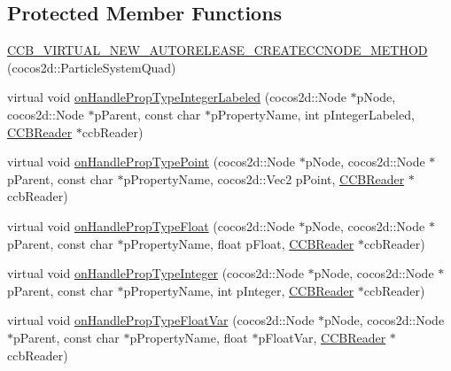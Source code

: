 \subsection*{Protected Member Functions}
\begin{DoxyCompactItemize}
\item 
\hyperlink{classcocosbuilder_1_1ParticleSystemQuadLoader_a6b73cbf9bdc20a14180835461c7916d7}{C\+C\+B\+\_\+\+V\+I\+R\+T\+U\+A\+L\+\_\+\+N\+E\+W\+\_\+\+A\+U\+T\+O\+R\+E\+L\+E\+A\+S\+E\+\_\+\+C\+R\+E\+A\+T\+E\+C\+C\+N\+O\+D\+E\+\_\+\+M\+E\+T\+H\+OD} (cocos2d\+::\+Particle\+System\+Quad)
\item 
virtual void \hyperlink{classcocosbuilder_1_1ParticleSystemQuadLoader_afeb4bcb4009c9fa6815c0f047109e978}{on\+Handle\+Prop\+Type\+Integer\+Labeled} (cocos2d\+::\+Node $\ast$p\+Node, cocos2d\+::\+Node $\ast$p\+Parent, const char $\ast$p\+Property\+Name, int p\+Integer\+Labeled, \hyperlink{classcocosbuilder_1_1CCBReader}{C\+C\+B\+Reader} $\ast$ccb\+Reader)
\item 
virtual void \hyperlink{classcocosbuilder_1_1ParticleSystemQuadLoader_a4889d27aac2073ebee6c9648fbf59c1f}{on\+Handle\+Prop\+Type\+Point} (cocos2d\+::\+Node $\ast$p\+Node, cocos2d\+::\+Node $\ast$p\+Parent, const char $\ast$p\+Property\+Name, cocos2d\+::\+Vec2 p\+Point, \hyperlink{classcocosbuilder_1_1CCBReader}{C\+C\+B\+Reader} $\ast$ccb\+Reader)
\item 
virtual void \hyperlink{classcocosbuilder_1_1ParticleSystemQuadLoader_ababa9b833a13d4ea475f71978e491fe2}{on\+Handle\+Prop\+Type\+Float} (cocos2d\+::\+Node $\ast$p\+Node, cocos2d\+::\+Node $\ast$p\+Parent, const char $\ast$p\+Property\+Name, float p\+Float, \hyperlink{classcocosbuilder_1_1CCBReader}{C\+C\+B\+Reader} $\ast$ccb\+Reader)
\item 
virtual void \hyperlink{classcocosbuilder_1_1ParticleSystemQuadLoader_a28d6a46cce1f26024d6915d81608ae8d}{on\+Handle\+Prop\+Type\+Integer} (cocos2d\+::\+Node $\ast$p\+Node, cocos2d\+::\+Node $\ast$p\+Parent, const char $\ast$p\+Property\+Name, int p\+Integer, \hyperlink{classcocosbuilder_1_1CCBReader}{C\+C\+B\+Reader} $\ast$ccb\+Reader)
\item 
virtual void \hyperlink{classcocosbuilder_1_1ParticleSystemQuadLoader_a08d967bb732e2824782f26e3142a7183}{on\+Handle\+Prop\+Type\+Float\+Var} (cocos2d\+::\+Node $\ast$p\+Node, cocos2d\+::\+Node $\ast$p\+Parent, const char $\ast$p\+Property\+Name, float $\ast$p\+Float\+Var, \hyperlink{classcocosbuilder_1_1CCBReader}{C\+C\+B\+Reader} $\ast$ccb\+Reader)
\item 

\end{DoxyCompactItemize}
